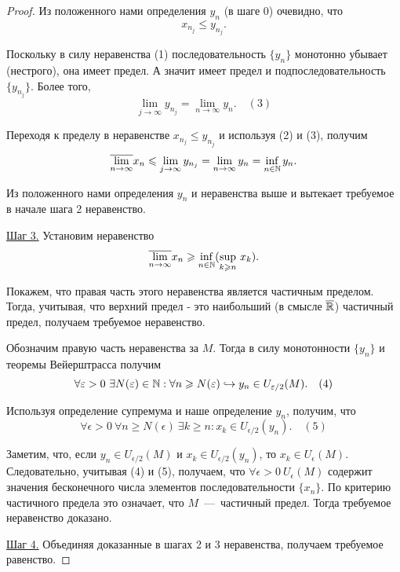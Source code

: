 \begin{proof}
    Из положенного нами определения $y_{n}$ (в шаге 0) очевидно, что
    $$ x_{n_{j}} \leq y_{n_{j}}.$$

    Поскольку в силу неравенства (1) последовательность $\{ y_{n} \}$ монотонно убывает (нестрого), она имеет предел. А значит имеет предел и подпоследовательность $\{ y_{n_{j}}\}$. Более того,
    $$ \lim\limits_{j\to \infty} y_{n_{j}} = \lim\limits_{n\to \infty} y_{n}. \quad (3)$$

    Переходя к пределу в неравенстве $x_{n_{j}} \leq y_{n_{j}}$ и используя (2) и (3), получим
    $$ \overline{\lim\limits_{n\to \infty}} x_{n} \leqslant \lim\limits_{j\to \infty} y_{n_{j}} = \lim\limits_{n\to \infty} y_{n} = \inf\limits_{n \in \mathbb{N}} y_{n}. $$

    Из положенного нами определения $y_{n}$ и неравенства выше и вытекает требуемое в начале шага 2 неравенство.

    \underline{Шаг 3.} Установим неравенство
    $$ \overline{\lim\limits_{n\to \infty}} x_{n} \geqslant \underset{n \in \mathbb{N}}{\inf} ({\sup\limits_{k \geqslant n}} \  x_{k}).$$

    Покажем, что правая часть этого неравенства является частичным пределом. Тогда, учитывая, что верхний предел - это наибольший (в смысле $\overline{\mathbb{R}}$) частичный предел, получаем требуемое неравенство.

    Обозначим правую часть неравенства за $M$. Тогда в силу монотонности $\{ y_{n} \}$ и теоремы Вейерштрасса получим
    $$ \forall \varepsilon > 0 \  \exists N (\varepsilon) \in \mathbb{N}: \forall n \geqslant N (\varepsilon) \hookrightarrow y_{n} \in U_{\varepsilon / 2} (M). \quad (4)$$

    Используя определение супремума и наше определение $y_{n}$, получим, что
    $$ \forall \epsilon > 0 \  \forall n \geq N (\epsilon) \  \exists k \geq n: x_{k} \in U_{\epsilon / 2} (y_{n}). \quad (5)$$

    Заметим, что, если $y_{n} \in U_{\epsilon / 2} (M)$ и $x_{k} \in U_{\epsilon / 2} (y_{n})$, то $x_{k} \in U_{\epsilon} (M)$. Следовательно, учитывая (4) и (5), получаем, что $\forall \epsilon > 0 \  U_{\epsilon} (M)$ содержит значения бесконечного числа элементов последовательности $\{ x_{n} \}$. По критерию частичного предела это означает, что $M$~---~частичный предел. Тогда требуемое неравенство доказано.

    \underline{Шаг 4.} Объединяя доказанные в шагах 2 и 3 неравенства, получаем требуемое равенство.
\end{proof}




